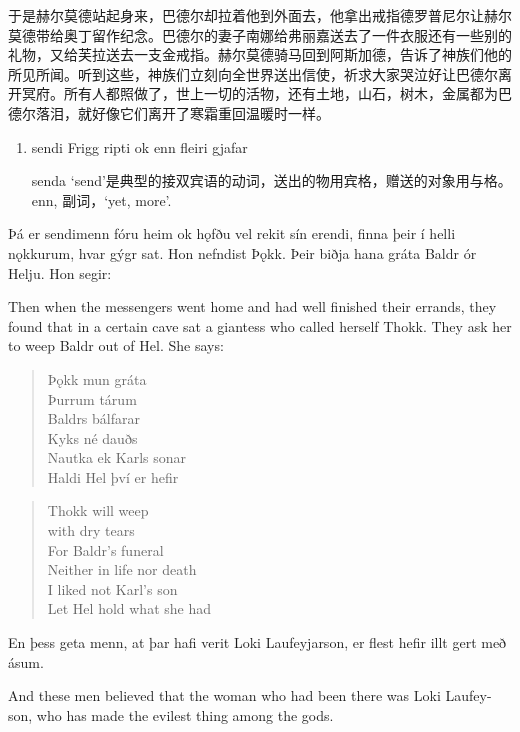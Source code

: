 \begin{translation*}{}
    于是赫尔莫德站起身来，巴德尔却拉着他到外面去，他拿出戒指德罗普尼尔让赫尔莫德带给奥丁留作纪念。巴德尔的妻子南娜给弗丽嘉送去了一件衣服还有一些别的礼物，又给芙拉送去一支金戒指。赫尔莫德骑马回到阿斯加德，告诉了神族们他的所见所闻。听到这些，神族们立刻向全世界送出信使，祈求大家哭泣好让巴德尔离开冥府。所有人都照做了，世上一切的活物，还有土地，山石，树木，金属都为巴德尔落泪，就好像它们离开了寒霜重回温暖时一样。
\end{translation*}
\begin{grammar*}{}
    \begin{enumerate}[leftmargin=*]
        \item sendi Frigg ripti ok enn fleiri gjafar

              senda `send'是典型的接双宾语的动词，送出的物用宾格，赠送的对象用与格。enn, 副词，`yet, more'.
    \end{enumerate}
\end{grammar*}
\begin{paracol}{2}
    Þá er sendimenn fóru heim ok hǫfðu vel rekit sín erendi, finna þeir í helli nǫkkurum, hvar gýgr sat. Hon nefndist Þǫkk. Þeir biðja hana gráta Baldr ór Helju. Hon segir:

    \switchcolumn

    Then when the messengers went home and had well finished their errands, they found that in a certain cave sat a giantess who called herself Thokk. They ask her to weep Baldr out of Hel. She says:
    \switchcolumn*

    \begin{quote}
        Þǫkk mun gráta\\
        Þurrum tárum\\
        Baldrs bálfarar\\
        Kyks né dauðs\\
        Nautka ek Karls sonar\\
        Haldi Hel því er hefir
    \end{quote}

    \switchcolumn

    \begin{quote}
        Thokk will weep\\
        with dry tears\\
        For Baldr's funeral\\
        Neither in life nor death\\
        I liked not Karl's son\\
        Let Hel hold what she had
    \end{quote}

    \switchcolumn*
    En þess geta menn, at þar hafi verit Loki Laufeyjarson, er flest hefir illt gert með ásum.

    \switchcolumn

    And these men believed that the woman who had been there was Loki Laufey-son, who has made the evilest thing among the gods.
\end{paracol}
